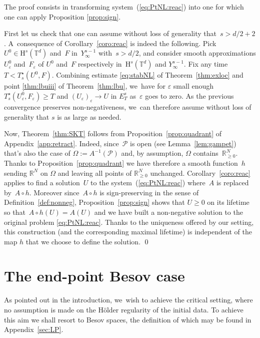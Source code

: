 \documentclass[JEP,XML,SOM,Unicode,published]{cedram}
\theoremstyle{definition}
\newcommand\R{\mathbb{R}}
\newcommand\T{\mathbb{T}}
\renewcommand\H{\mathrm{H}}
\let\ep\varepsilon
\begin{document}
The proof consists in transforming system~(\ref{eq:PtNL:reac}) into one for which one can apply Proposition \ref{prop:sign}.

First let us check that one can assume without loss of generality that~$s>d/2+2$. A~consequence of Corollary~\ref{coro:reac} is indeed the following. Pick~$U^0\in\H^s(\T^d)$ and~$F$ in~$Y_\infty^{s-1}$ with~$s>d/2$, and consider smooth approximations $U^0_\ep$ and~$F_\ep$ of $U^0$ and~$F$ respectively in~$\H^s(\T^d)$ and $Y_\infty^{s-1}$. Fix any time~$T<T_s^\star(U^0,F)$. Combining estimate \eqref{eq:stabNL} of Theorem~\ref{thm:exloc} and point \eqref{thm:lbuiii} of Theorem~\ref{thm:lbu}, we~have for $\ep$ small enough $T_s^\star(U^0_\ep,F_\ep) \geq T$ and $(U_\ep)_\ep\to U$ in $E_T^s$ as~$\ep$ goes to zero. As the previous convergence preserves non-negativeness, we~can therefore assume without loss of generality that $s$ is as large as needed.

Now, Theorem~\ref{thm:SKT} follows from Proposition~\ref{prop:quadrant} of Appendix~\ref{app:retract}. Indeed, since~$\mathscr{P}$ is open (see Lemma~\ref{lem:gampet}) that's also the case of $\Omega:= A^{-1}(\mathscr{P})$ and, by assumption, $\Omega$ contains~$\R_{\geq 0}^N$. Thanks to Proposition~\ref{prop:quadrant} we have therefore a smooth function~$h$ sending $\R^N$ on $\Omega$ and leaving all points of $\R_{\geq 0}^N$ unchanged. Corollary~\ref{coro:reac} applies to find a solution~$U$ to the system~(\ref{eq:PtNL:reac}) where~$A$ is replaced by~$A\circ h$. Moreover since~$A\circ h$ is sign-preserving in the sense of Definition~\ref{def:nonneg}, Proposition~\ref{prop:sign} shows that $U\geq 0$ on its lifetime so that~$A\circ h(U) = A(U)$ and we have built a non-negative solution to the original problem \eqref{eq:PtNL:reac}. Thanks to the uniqueness offered by our setting, this construction (and the corresponding maximal lifetime) is independent of the map $h$ that we choose to define the solution.
\qed

\section{The end-point Besov case}
\label{end-point Besov}
As pointed out in the introduction, we~wish to achieve the critical setting, where no assumption is made on the H\"older regularity of the initial data. To achieve this aim we shall resort to Besov spaces, the definition of which may be found in Appendix~\ref{sec:LP}.
\end{document}
